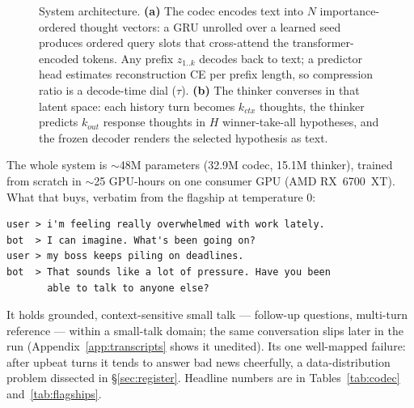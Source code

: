 \documentclass[11pt]{article}
\begin{document}
\begin{figure}[t]
{%
}
\caption{System architecture. \textbf{(a)} The codec encodes text into $N$
importance-ordered thought vectors: a GRU unrolled over a learned seed
produces ordered query slots that cross-attend the transformer-encoded
tokens. Any prefix $z_{1..k}$ decodes back to text; a predictor head
estimates reconstruction CE per prefix length, so compression ratio is a
decode-time dial ($\tau$). \textbf{(b)} The thinker converses in that latent
space: each history turn becomes $k_{ctx}$ thoughts, the thinker predicts
$k_{out}$ response thoughts in $H$ winner-take-all hypotheses, and the frozen
decoder renders the selected hypothesis as text.}
\label{fig:arch}
\end{figure}

The whole system is $\sim$48M parameters (32.9M codec, 15.1M thinker),
trained from scratch in $\sim$25 GPU-hours on one consumer GPU (AMD
RX~6700~XT). What that buys, verbatim from the flagship at temperature 0:

\begin{verbatim}
user > i'm feeling really overwhelmed with work lately.
bot  > I can imagine. What's been going on?
user > my boss keeps piling on deadlines.
bot  > That sounds like a lot of pressure. Have you been
       able to talk to anyone else?
\end{verbatim}

It holds grounded, context-sensitive small talk --- follow-up questions,
multi-turn reference --- within a small-talk domain; the same conversation
slips later in the run (Appendix~\ref{app:transcripts} shows it unedited).
Its one well-mapped failure: after upbeat turns it tends to answer bad news
cheerfully, a data-distribution problem dissected in \S\ref{sec:register}.
Headline numbers are in Tables~\ref{tab:codec} and~\ref{tab:flagships}.
\end{document}
